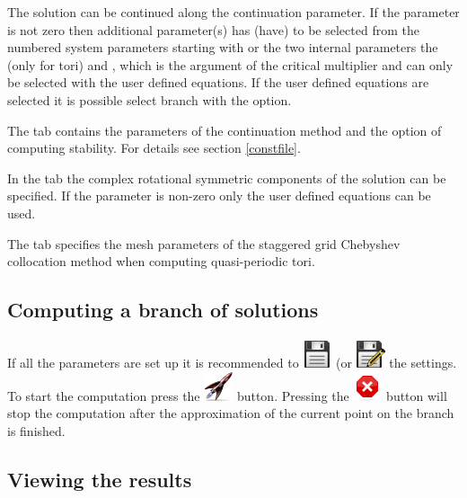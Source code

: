 \documentclass[10pt,a4paper]{ddedoc}
\newcommand{\iconRun}{\protect\includegraphics[height=0.8\baselineskip]{fig/cr32-action-launch}}
\newcommand{\iconStop}{\protect\includegraphics[height=0.8\baselineskip]{fig/cr32-action-stop}}
\newcommand{\iconSaveAs}{\protect\includegraphics[height=0.8\baselineskip]{fig/cr32-action-filesaveas}}
\newcommand{\iconSave}{\protect\includegraphics[height=0.8\baselineskip]{fig/cr32-action-filesave}}
\begin{document}
The solution can be continued along the  continuation parameter. If
the  parameter is not zero then additional parameter(s)
 has (have) to be selected from the numbered system parameters
starting with  or the two internal parameters the  (only for tori) and , which is the argument of the
critical multiplier and can only be selected with the user defined equations.
If the user defined equations are selected it is possible select branch with
the  option.

The  tab contains the parameters of the continuation method and
the option of computing stability. For details see section \ref{constfile}.

In the  tab the complex rotational symmetric components of the
solution can be specified. If the parameter  is non-zero only the
user defined equations can be used.

The  tab specifies the mesh parameters of the staggered grid
Chebyshev collocation method when computing quasi-periodic tori.

\subsection{Computing a branch of solutions}

If all the parameters are set up it is recommended to  \iconSave{}
(or  \iconSaveAs{} the settings. To start the computation
press the  \iconRun{} button. Pressing the  \iconStop{}
button will stop the computation after the approximation of the current point on
the branch is finished.

\subsection{Viewing the results}
\end{document}
